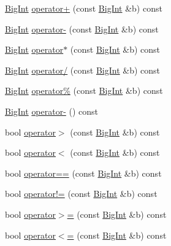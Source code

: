 \begin{DoxyCompactItemize}
\hyperlink{class_big_int}{Big\+Int} \hyperlink{class_big_int_a468c8997e2ec45ef37d5ff32becc5818}{operator+} (const \hyperlink{class_big_int}{Big\+Int} \&b) const 
\item 
\hyperlink{class_big_int}{Big\+Int} \hyperlink{class_big_int_a64ef59813d4221635ae33f8de10f88cb}{operator-\/} (const \hyperlink{class_big_int}{Big\+Int} \&b) const 
\item 
\hyperlink{class_big_int}{Big\+Int} \hyperlink{class_big_int_aa4e3204ae4a0c81e8e33d0a848078a8d}{operator$\ast$} (const \hyperlink{class_big_int}{Big\+Int} \&b) const 
\item 
\hyperlink{class_big_int}{Big\+Int} \hyperlink{class_big_int_ab5679019b8821c01b161147495e21a4e}{operator/} (const \hyperlink{class_big_int}{Big\+Int} \&b) const 
\item 
\hyperlink{class_big_int}{Big\+Int} \hyperlink{class_big_int_ae9bbf1128217cb469123350f92e4c62f}{operator\%} (const \hyperlink{class_big_int}{Big\+Int} \&b) const 
\item 
\hyperlink{class_big_int}{Big\+Int} \hyperlink{class_big_int_a56350bc8395ed38c2afdbb4554e56b1f}{operator-\/} () const 
\item 
bool \hyperlink{class_big_int_a4631ce319f6617a43a4dc89127953ebb}{operator$>$} (const \hyperlink{class_big_int}{Big\+Int} \&b) const 
\item 
bool \hyperlink{class_big_int_a56b4522f02907f0d719809a0e81c525e}{operator$<$} (const \hyperlink{class_big_int}{Big\+Int} \&b) const 
\item 
bool \hyperlink{class_big_int_a057d936831e7a103a1830366c990602f}{operator==} (const \hyperlink{class_big_int}{Big\+Int} \&b) const 
\item 
bool \hyperlink{class_big_int_ad6a59ed7dedbe35433c1a83ca751fe88}{operator!=} (const \hyperlink{class_big_int}{Big\+Int} \&b) const 
\item 
bool \hyperlink{class_big_int_ae5bdb87103df4be652062b015a1fa653}{operator$>$=} (const \hyperlink{class_big_int}{Big\+Int} \&b) const 
\item 
bool \hyperlink{class_big_int_ada9b7b9e96bb3aad13c48637397b6f31}{operator$<$=} (const \hyperlink{class_big_int}{Big\+Int} \&b) const 
\end{DoxyCompactItemize}
